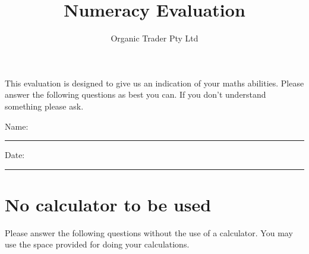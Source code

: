\documentclass{article}
\begin{document}
\newcommand{\answer}[1]{
  \textcolor{red}{#1}
}
\ifdefined\showanswers
\else
  \renewcommand{\answer}[1]{}
\fi
\title{Numeracy Evaluation \answer{with answers}}
\author{Organic Trader Pty Ltd}

\maketitle
\noindent This evaluation is designed to give us an indication of your maths abilities. Please answer the following questions as best you can. If you don't understand something please ask.

\hspace{5mm}

\noindent Name: \rule{3cm}{0.2pt}

\hspace{5mm}

\noindent Date: \rule{3cm}{0.2pt}



\section{No calculator to be used}

Please answer the following questions without the use of a calculator. You may use the space provided for doing your calculations.
\end{document}
